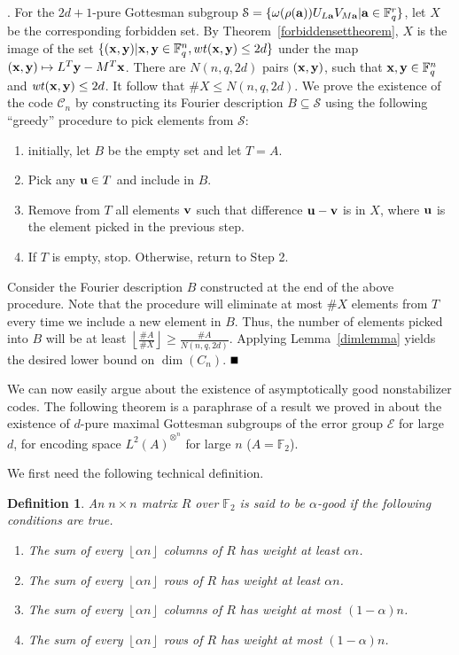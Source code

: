 \documentclass{Rinton-P9x6}
\newtheorem{definition}[theorem]{Definition}
\newcommand{\floor}[1]{\ensuremath{\left\lfloor{#1}\right\rfloor}}
\newcommand{\F}{\ensuremath{\mathbb{F}}}
\newcommand{\GF}[2][]{{\ensuremath{\mathbb{F}_{#2}^{#1}}}}
\newcommand{\bproof}{\noindent{\it Proof}}
\newcommand{\eproof}{\hspace*{\fill}$\rule{2mm}{2mm}$~~~~~\bigskip}
\renewenvironment{proof}{\bproof. }{\eproof}
\renewcommand{\a}{{\bf a}}
\newcommand{\x}{{\bf x}}
\renewcommand{\v}{{\bf v}}
\renewcommand{\u}{{\bf u}}
\newcommand{\y}{{\bf y}}
\newcommand{\wt}{{\it wt}}
\newcommand{\C}{{\ensuremath{\mathcal{C}}}}
\renewcommand{\S}{{\ensuremath{\mathcal{S}}}}
\newcommand{\HinA}{{\ensuremath{{L^2(A)}^{\otimes^n}}}}
\newcommand{\E}{{\ensuremath{\mathcal{E}}}}
\begin{document}
\begin{proof}
  For the $2d+1$-pure Gottesman subgroup $\S=\{ \omega(\rho(\a)) U_{L
    \a} V_{M \a} | \a \in \GF[r]{q}\}$, let $X$ be the corresponding
  forbidden set. By Theorem~\ref{forbiddensettheorem}, $X$ is the
  image of the set $\{ (\x,\y) | \x,\y\in \GF[n]{q}, wt(\x,\y) \leq
  2d\}$ under the map $(\x,\y) \mapsto L^T \y - M^T \x$. There are $N(n,q,2d)$ pairs
  $(\x,\y)$, such that $\x,\y \in \GF[n]{q}$ and $\wt(\x,\y)\leq 2d$.
  It follow that $\#X\leq N(n,q,2d)$. We prove the existence of the code $\C_n$
  by constructing its Fourier description $B\subseteq \S$ using the
  following ``greedy'' procedure to pick elements from $\S$:

  \begin{enumerate}
  \item initially, let $B$ be the empty set and let $T = A$.
  \item Pick any $\u \in T$ and include in $B$.
  \item Remove from $T$ all elements $\v$ such that difference $\u
   -\v$ is in $X$, where $\u$ is the element picked in the previous
    step.
  \item If $T$ is empty, stop. Otherwise, return to Step 2.
  \end{enumerate}
  
  Consider the Fourier description $B$ constructed at the end of the
  above procedure. Note that the procedure will eliminate at most
  $\#X$ elements from $T$ every time we include a new element in $B$.
  Thus, the number of elements picked into $B$ will be at least
  $\floor{\frac{\#A}{\#X}}\geq \frac{\#A}{N(n,q,2d)}$. Applying
  Lemma~\ref{dimlemma} yields the desired lower bound on $\dim(C_n)$.
\end{proof}

We can now easily argue about the existence of asymptotically good
nonstabilizer codes. The following theorem is a paraphrase of a result
we proved in\cite{AP02} about the existence of $d$-pure maximal
Gottesman subgroups of the error group $\E$ for large $d$, for encoding
space $\HinA$ for large $n$ ($A=\F_2$).

We first need the following technical definition.

\begin{definition}\label{good}
  An $n\times n$ matrix $R$ over $\F_2$ is said to be
  $\alpha$-\emph{good} if the following conditions are true.
\begin{enumerate}
\item[(i)] The sum of every $\floor{\alpha n}$ columns of $R$ has weight at
  least $\alpha n$.
\item[(ii)] The sum of every $\floor{\alpha n}$ rows of $R$ has weight at
  least $\alpha n$.
\item[(iii)] The sum of every $\floor{\alpha n}$ columns of $R$ has weight at
  most $(1-\alpha)n$.
\item[(iv)] The sum of every $\floor{\alpha n}$ rows of $R$ has weight at
  most $(1-\alpha)n$.
\end{enumerate}
\end{definition}
\end{document}
